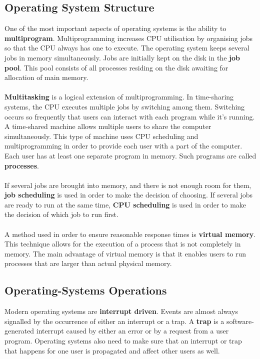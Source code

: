 \documentclass{article}
\begin{document}
\subsection{Operating System Structure}
One of the most important aspects of operating systems is the ability to \textbf{multiprogram}. Multiprogramming increases CPU utilisation by organising jobs so that the CPU always has one to execute. The operating system keeps several jobs in memory simultaneously. Jobs are initially kept on the disk in the \textbf{job pool}. This pool consists of all processes residing on the disk awaiting for allocation of main memory. \\ \\ \textbf{Multitasking} is a logical extension of multiprogramming. In time-sharing systems, the CPU executes multiple jobs by switching among them. Switching occurs so frequently that users can interact with each program while it's running. A time-shared machine allows multiple users to share the computer simultaneously. This type of machine uses CPU scheduling and multiprogramming in order to provide each user with a part of the computer. Each user has at least one separate program in memory. Such programs are called \textbf{processes}. \\ \\
If several jobs are brought into memory, and there is not enough room for them, \textbf{job scheduling} is used in order to make the decision of choosing. If several jobs are ready to run at the same time, \textbf{CPU scheduling} is used in order to make the decision of which job to run first. \\ \\
A method used in order to ensure reasonable response times is \textbf{virtual memory}. This technique allows for the execution of a process that is not completely in memory. The main advantage of virtual memory is that it enables users to run processes that are larger than actual physical memory.

\subsection{Operating-Systems Operations}
Modern operating systems are \textbf{interrupt driven}. Events are almost always signalled by the occurrence of either an interrupt or a trap. A \textbf{trap} is a software-generated interrupt caused by either an error or by a request from a user program. Operating systems also need to make sure that an interrupt or trap that happens for one user is propagated and affect other users as well.
\end{document}
